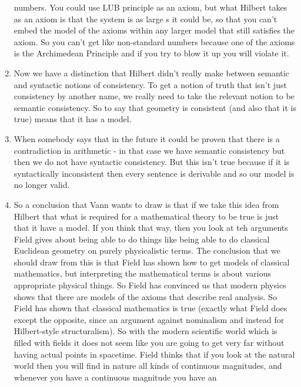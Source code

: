 \documentclass[12pt]{article}
\theoremstyle{definition}
\begin{document}
\begin{enumerate}
        numbers. You could use LUB principle as an axiom, but what Hilbert
        takes as an axiom is that the system is as large s it could be, so that
        you can't embed the model of the axioms within any larger model that
        still satisfies the axiom. So you can't get like non-standard numbers
        because one of the axioms is the Archimedean Principle and if you try
        to blow it up you will violate it.
    \item
        Now we have a distinction that Hilbert didn't really make between
        semantic and syntactic notions of consistency. To get a notion of truth
        that isn't just consistency by another name, we really need to take the
        relevant notion to be semantic consistency. So to say that geometry is
        consistent (and also that it is true) means that it has a model.
    \item
        When somebody says that in the future it could be proven that there is
        a contradiction in arithmetic - in that case we have semantic
        consistency but then we do not have syntactic consistency. But this
        isn't true because if it is syntactically inconsistent then every
        sentence is derivable and so our model is no longer valid.
    \item
        So a conclusion that Vann wants to draw is that if we take this idea
        from Hilbert that what is required for a mathematical theory to be true
        is just that it have a model. If you think that way, then you look at
        teh arguments Field gives about being able to do things like being able
        to do classical Euclidean geometry on purely physicalistic terms. The
        conclusion that we should draw from this is that Field has shown how to
        get models of classical mathematics, but interpreting the mathematical
        terms is about various appropriate physical things. So Field has
        convinced us that modern physics shows that there are models of the
        axioms that describe real analysis. So Field has shown that classical
        mathematics is true (exactly what Field does except the opposite, since
        an argument against nominalism and instead for Hilbert-style
        structuralism). So with the modern scientific world which is filled
        with fields it does not seem like you are going to get very far without
        having actual points in spacetime. Field thinks that if you look at the
        natural world then you will find in nature all kinds of continuous
        magnitudes, and whenever you have a continuous magnitude you have an

\end{enumerate}
\end{document}
